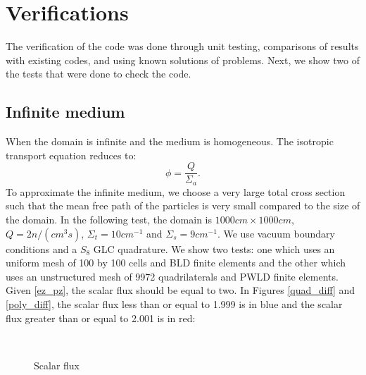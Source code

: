 \section{Verifications}
The verification of the code was done through unit testing, comparisons of
results with existing codes, and using known solutions of problems. Next, we
show two of the tests that were done to check the code.
\subsection{Infinite medium}
When the domain is infinite and the medium is homogeneous. The isotropic
transport equation reduces to:
\begin{equation}
  \phi = \frac{Q}{\Sigma_a}.
  \label{ez_pz}
\end{equation}
To approximate the infinite medium, we choose a very large total cross section
such that the mean free path of the particles is very small compared to the
size of the domain. In the following test, the domain is $1000cm \times
1000cm$, $Q = 2 n/(cm^3s)$, $\Sigma_t = 10 cm^{-1}$ and $\Sigma_s = 9
cm^{-1}$. We use vacuum boundary conditions and a $S_{8}$ GLC quadrature.
We show two tests: one which uses an uniform mesh of 100 by 100 cells and BLD
finite elements and the other which uses an unstructured mesh of 9972
quadrilaterals and PWLD finite elements. Given \cref{ez_pz}, the scalar flux
should be equal to two. In Figures \ref{quad_diff} and \ref{poly_diff}, the 
scalar flux less than or equal to 1.999 is in blue and the scalar flux greater
than or equal to 2.001 is in red:
\begin{figure}[H]
  \centering
  \\
  \caption{Scalar flux}
\end{figure}
